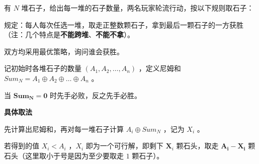 有 $N$ 堆石子，给出每一堆的石子数量，两名玩家轮流行动，按以下规则取石子：

规定：每人每次任选一堆，取走正整数颗石子，拿到最后一颗石子的一方获胜（注：几个特点是\textbf{不能跨堆}、\textbf{不能不拿}）。

双方均采用最优策略，询问谁会获胜。

记初始时各堆石子的数量 $(A_1,A_2,\dots,A_n)$ ，定义尼姆和 $Sum_N = A_1 \oplus A_2 \oplus \dots \oplus A_n$ 。

当 $\pmb{ Sum_N = 0 }$ 时先手必败，反之先手必胜。

\textbf{具体取法}

先计算出尼姆和，再对每一堆石子计算 $A_i \oplus Sum_N$ ，记为 $X_i$ 。

若得到的值 $X_i<A_i$ ，$X_i$ 即为一个可行解，即剩下 $\pmb X_i$ 颗石头，取走 $\pmb {A_i - X_i}$ 颗石头（这里取小于号是因为至少要取走 $1$ 颗石子）。
